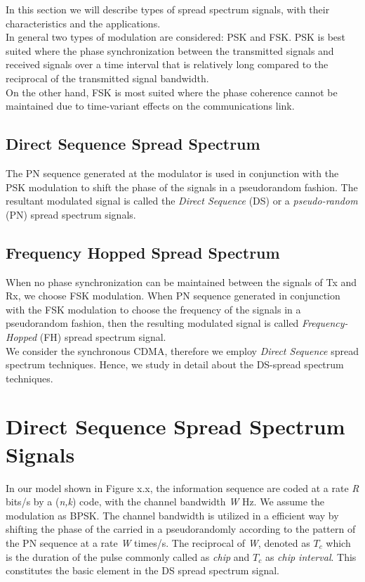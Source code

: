 In this section we will describe types of spread spectrum signals, with their characteristics and the applications. \\

In general two types of modulation are considered: PSK and FSK. PSK is best suited where the phase synchronization between the transmitted signals and received signals over a time interval that is relatively long compared to the reciprocal of the transmitted signal bandwidth. \\

On the other hand, FSK is most suited where the phase coherence cannot be maintained due to time-variant effects on the communications link. 

\subsection{Direct Sequence Spread Spectrum}

The PN sequence generated at the modulator is used in conjunction with the PSK modulation to shift the phase of the signals in a pseudorandom fashion. The resultant modulated signal is called the \textit{Direct Sequence} (DS) or a \textit{pseudo-random} (PN) spread spectrum signals. 

\subsection{Frequency Hopped Spread Spectrum}

When no phase synchronization can be maintained between the signals of Tx and Rx, we choose FSK modulation. When PN sequence generated in conjunction with the FSK modulation to choose the frequency of the signals in a pseudorandom fashion, then the resulting modulated signal is called \textit{Frequency-Hopped} (FH) spread spectrum signal.\\

We consider the synchronous CDMA, therefore we employ \textit{Direct Sequence} spread spectrum techniques. Hence, we study in detail about the DS-spread spectrum techniques. 

\section{Direct Sequence Spread Spectrum Signals}

In our model shown in Figure x.x, the information sequence are coded at a rate \textit{R} bits/s by a (\textit{n,k}) code, with the channel bandwidth \textit{W} Hz. We assume the modulation as BPSK. The channel bandwidth is utilized in a efficient way by shifting the phase of the carried in a pseudorandomly according to the pattern of the PN sequence at a rate \textit{W} times/s. The reciprocal of \textit{W}, denoted as $T_c$ which is the duration of the pulse commonly called as \textit{chip} and $T_c$ as \textit{chip interval}. This constitutes the basic element in the DS spread spectrum signal. \\

